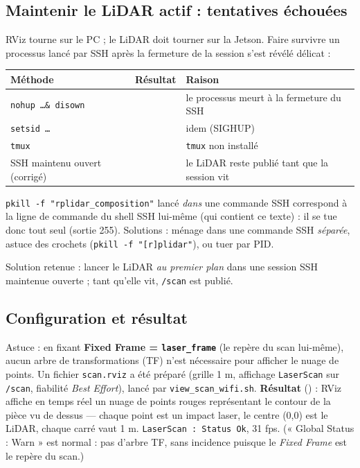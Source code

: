 \documentclass[a4paper,11pt]{article}
\newcommand{\ok}{\textcolor{success}{\checkmark}}
\newcommand{\ko}{\textcolor{danger}{\ding{55}}}
\begin{document}
\subsection{Maintenir le LiDAR actif : tentatives échouées}
RViz tourne sur le PC ; le LiDAR doit tourner sur la Jetson. Faire survivre un
processus lancé par SSH après la fermeture de la session s'est révélé délicat :
\begin{center}
\begin{tabularx}{\textwidth}{@{}l c X@{}}
\toprule
Méthode & Résultat & Raison \\
\midrule
\texttt{nohup \ldots \& disown}      & \ko & le processus meurt à la fermeture du SSH \\
\texttt{setsid \ldots}               & \ko & idem (SIGHUP) \\
\texttt{tmux}                        & \ko & \texttt{tmux} non installé \\
SSH maintenu ouvert (corrigé)        & \ok & le LiDAR reste publié tant que la session vit \\
\bottomrule
\end{tabularx}
\end{center}
\begin{tcolorbox}[colback=lightorange,colframe=warning,title=Piège : auto-suppression par pkill]
\texttt{pkill -f "rplidar\_composition"} lancé \emph{dans} une commande SSH
correspond à la ligne de commande du shell SSH lui-même (qui contient ce texte) :
il se tue donc tout seul (sortie 255). Solutions : ménage dans une commande SSH
\emph{séparée}, astuce des crochets (\texttt{pkill -f "[r]plidar"}), ou tuer par
PID.
\end{tcolorbox}
\noindent Solution retenue : lancer le LiDAR \emph{au premier plan} dans une
session SSH maintenue ouverte ; tant qu'elle vit, \texttt{/scan} est publié.

\subsection{Configuration et résultat}
Astuce : en fixant \textbf{Fixed Frame = \texttt{laser\_frame}} (le repère du scan
lui-même), aucun arbre de transformations (TF) n'est nécessaire pour afficher le
nuage de points. Un fichier \texttt{scan.rviz} a été préparé (grille 1 m, affichage
\texttt{LaserScan} sur \texttt{/scan}, fiabilité \emph{Best Effort}), lancé par
\texttt{view\_scan\_wifi.sh}. \textbf{Résultat} (\ok) : RViz affiche en temps réel
un nuage de points rouges représentant le contour de la pièce vu de dessus ---
chaque point est un impact laser, le centre (0,0) est le LiDAR, chaque carré vaut
1 m. \texttt{LaserScan : Status Ok}, 31 fps. (« Global Status : Warn » est normal :
pas d'arbre TF, sans incidence puisque le \emph{Fixed Frame} est le repère du
scan.)
\end{document}
